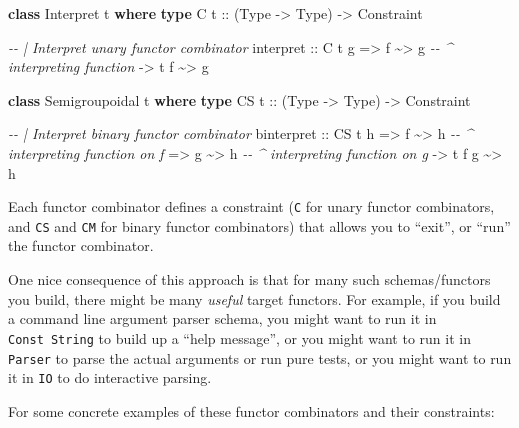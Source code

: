\documentclass[]{article}
\newenvironment{Shaded}{}{}
\newcommand{\CommentTok}[1]{\textcolor[rgb]{0.38,0.63,0.69}{\textit{#1}}}
\newcommand{\DataTypeTok}[1]{\textcolor[rgb]{0.56,0.13,0.00}{#1}}
\newcommand{\KeywordTok}[1]{\textcolor[rgb]{0.00,0.44,0.13}{\textbf{#1}}}
\newcommand{\NormalTok}[1]{#1}
\newcommand{\OperatorTok}[1]{\textcolor[rgb]{0.40,0.40,0.40}{#1}}
\newcommand{\OtherTok}[1]{\textcolor[rgb]{0.00,0.44,0.13}{#1}}
\begin{document}
\begin{Shaded}
\begin{Highlighting}[]
\KeywordTok{class} \DataTypeTok{Interpret}\NormalTok{ t }\KeywordTok{where}
    \KeywordTok{type} \DataTypeTok{C}\OtherTok{ t ::}\NormalTok{ (}\DataTypeTok{Type} \OtherTok{{-}>} \DataTypeTok{Type}\NormalTok{) }\OtherTok{{-}>} \DataTypeTok{Constraint}

    \CommentTok{{-}{-} | Interpret unary functor combinator}
\NormalTok{    interpret}
\OtherTok{        ::} \DataTypeTok{C}\NormalTok{ t g}
        \OtherTok{=>}\NormalTok{ f }\OperatorTok{\textasciitilde{}>}\NormalTok{ g             }\CommentTok{{-}{-} \^{} interpreting function}
        \OtherTok{{-}>}\NormalTok{ t f }\OperatorTok{\textasciitilde{}>}\NormalTok{ g}

\KeywordTok{class} \DataTypeTok{Semigroupoidal}\NormalTok{ t }\KeywordTok{where}
    \KeywordTok{type} \DataTypeTok{CS}\OtherTok{ t ::}\NormalTok{ (}\DataTypeTok{Type} \OtherTok{{-}>} \DataTypeTok{Type}\NormalTok{) }\OtherTok{{-}>} \DataTypeTok{Constraint}

    \CommentTok{{-}{-} | Interpret binary functor combinator}
\NormalTok{    binterpret}
\OtherTok{        ::} \DataTypeTok{CS}\NormalTok{ t h}
        \OtherTok{=>}\NormalTok{ f }\OperatorTok{\textasciitilde{}>}\NormalTok{ h             }\CommentTok{{-}{-} \^{} interpreting function on f}
        \OtherTok{=>}\NormalTok{ g }\OperatorTok{\textasciitilde{}>}\NormalTok{ h             }\CommentTok{{-}{-} \^{} interpreting function on g}
        \OtherTok{{-}>}\NormalTok{ t f g }\OperatorTok{\textasciitilde{}>}\NormalTok{ h}
\end{Highlighting}
\end{Shaded}

Each functor combinator defines a constraint (\texttt{C} for unary functor
combinators, and \texttt{CS} and \texttt{CM} for binary functor combinators)
that allows you to ``exit'', or ``run'' the functor combinator.

One nice consequence of this approach is that for many such schemas/functors you
build, there might be many \emph{useful} target functors. For example, if you
build a command line argument parser schema, you might want to run it in
\texttt{Const\ String} to build up a ``help message'', or you might want to run
it in \texttt{Parser} to parse the actual arguments or run pure tests, or you
might want to run it in \texttt{IO} to do interactive parsing.

For some concrete examples of these functor combinators and their constraints:
\end{document}
